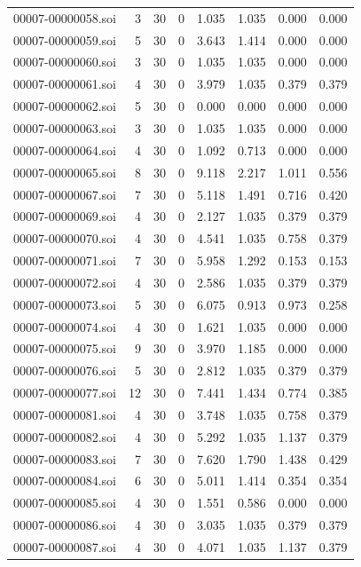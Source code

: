 \begin{tabular}{lrrrrrrr}
00007-00000058.soi & 3 & 30 & 0 & 1.035 & 1.035 & 0.000 & 0.000 \\
00007-00000059.soi & 5 & 30 & 0 & 3.643 & 1.414 & 0.000 & 0.000 \\
00007-00000060.soi & 3 & 30 & 0 & 1.035 & 1.035 & 0.000 & 0.000 \\
00007-00000061.soi & 4 & 30 & 0 & 3.979 & 1.035 & 0.379 & 0.379 \\
00007-00000062.soi & 5 & 30 & 0 & 0.000 & 0.000 & 0.000 & 0.000 \\
00007-00000063.soi & 3 & 30 & 0 & 1.035 & 1.035 & 0.000 & 0.000 \\
00007-00000064.soi & 4 & 30 & 0 & 1.092 & 0.713 & 0.000 & 0.000 \\
00007-00000065.soi & 8 & 30 & 0 & 9.118 & 2.217 & 1.011 & 0.556 \\
00007-00000067.soi & 7 & 30 & 0 & 5.118 & 1.491 & 0.716 & 0.420 \\
00007-00000069.soi & 4 & 30 & 0 & 2.127 & 1.035 & 0.379 & 0.379 \\
00007-00000070.soi & 4 & 30 & 0 & 4.541 & 1.035 & 0.758 & 0.379 \\
00007-00000071.soi & 7 & 30 & 0 & 5.958 & 1.292 & 0.153 & 0.153 \\
00007-00000072.soi & 4 & 30 & 0 & 2.586 & 1.035 & 0.379 & 0.379 \\
00007-00000073.soi & 5 & 30 & 0 & 6.075 & 0.913 & 0.973 & 0.258 \\
00007-00000074.soi & 4 & 30 & 0 & 1.621 & 1.035 & 0.000 & 0.000 \\
00007-00000075.soi & 9 & 30 & 0 & 3.970 & 1.185 & 0.000 & 0.000 \\
00007-00000076.soi & 5 & 30 & 0 & 2.812 & 1.035 & 0.379 & 0.379 \\
00007-00000077.soi & 12 & 30 & 0 & 7.441 & 1.434 & 0.774 & 0.385 \\
00007-00000081.soi & 4 & 30 & 0 & 3.748 & 1.035 & 0.758 & 0.379 \\
00007-00000082.soi & 4 & 30 & 0 & 5.292 & 1.035 & 1.137 & 0.379 \\
00007-00000083.soi & 7 & 30 & 0 & 7.620 & 1.790 & 1.438 & 0.429 \\
00007-00000084.soi & 6 & 30 & 0 & 5.011 & 1.414 & 0.354 & 0.354 \\
00007-00000085.soi & 4 & 30 & 0 & 1.551 & 0.586 & 0.000 & 0.000 \\
00007-00000086.soi & 4 & 30 & 0 & 3.035 & 1.035 & 0.379 & 0.379 \\
00007-00000087.soi & 4 & 30 & 0 & 4.071 & 1.035 & 1.137 & 0.379 \\

\end{tabular}
